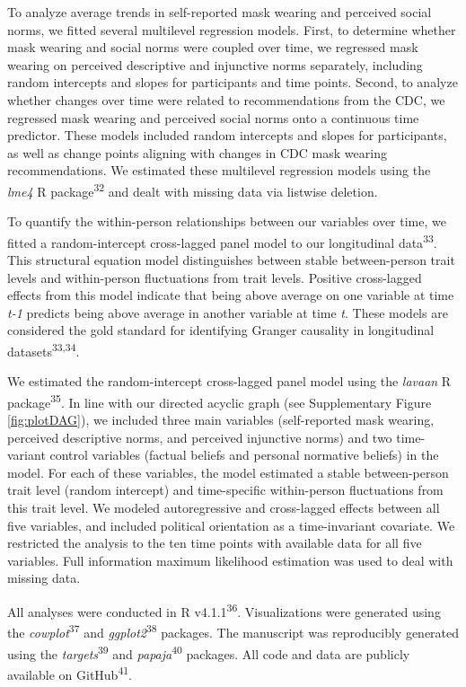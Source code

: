 \documentclass[
  man, donotrepeattitle,floatsintext]{apa6}
\begin{document}
To analyze average trends in self-reported mask wearing and perceived social norms, we fitted several multilevel regression models. First, to determine whether mask wearing and social norms were coupled over time, we regressed mask wearing on perceived descriptive and injunctive norms separately, including random intercepts and slopes for participants and time points. Second, to analyze whether changes over time were related to recommendations from the CDC, we regressed mask wearing and perceived social norms onto a continuous time predictor. These models included random intercepts and slopes for participants, as well as change points aligning with changes in CDC mask wearing recommendations. We estimated these multilevel regression models using the \emph{lme4} R package\textsuperscript{32} and dealt with missing data via listwise deletion.

To quantify the within-person relationships between our variables over time, we fitted a random-intercept cross-lagged panel model to our longitudinal data\textsuperscript{33}. This structural equation model distinguishes between stable between-person trait levels and within-person fluctuations from trait levels. Positive cross-lagged effects from this model indicate that being above average on one variable at time \emph{t-1} predicts being above average in another variable at time \emph{t}. These models are considered the gold standard for identifying Granger causality in longitudinal datasets\textsuperscript{33,34}.

We estimated the random-intercept cross-lagged panel model using the \emph{lavaan} R package\textsuperscript{35}. In line with our directed acyclic graph (see Supplementary Figure \ref{fig:plotDAG}), we included three main variables (self-reported mask wearing, perceived descriptive norms, and perceived injunctive norms) and two time-variant control variables (factual beliefs and personal normative beliefs) in the model. For each of these variables, the model estimated a stable between-person trait level (random intercept) and time-specific within-person fluctuations from this trait level. We modeled autoregressive and cross-lagged effects between all five variables, and included political orientation as a time-invariant covariate. We restricted the analysis to the ten time points with available data for all five variables. Full information maximum likelihood estimation was used to deal with missing data.

All analyses were conducted in R v4.1.1\textsuperscript{36}. Visualizations were generated using the \emph{cowplot}\textsuperscript{37} and \emph{ggplot2}\textsuperscript{38} packages. The manuscript was reproducibly generated using the \emph{targets}\textsuperscript{39} and \emph{papaja}\textsuperscript{40} packages. All code and data are publicly available on GitHub\textsuperscript{41}.
\end{document}
